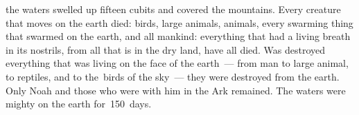\begin{inparaenum}
     the waters swelled up fifteen cubits and covered the mountains.%
     Every creature that moves on the earth died: birds, large animals, animals, every swarming thing that swarmed on the earth, and all mankind:%
     everything that had a living breath in its nostrils, from all that is in the dry land, have all died.%
     Was destroyed everything that was living on the face of the earth~--- from man to large animal, to reptiles, and to the\understood\ birds of the sky~--- they were destroyed from the earth. Only Noah and those who were with him in the Ark remained.%
     The waters were mighty on the earth for\understood\ 150~days.%
\end{inparaenum}
